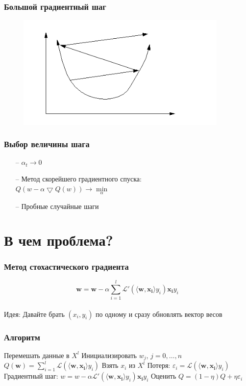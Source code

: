 \documentclass[10pt]{beamer}
\begin{document}
\begin{frame}\frametitle{Большой градиентный шаг}
	\begin{figure}[htbp]
	  \includegraphics[height=160pt, keepaspectratio = true]{images/learning_rate_large}
	\end{figure}
\end{frame}

\begin{frame}\frametitle{Выбор величины шага}
	\begin{itemize}
		\item[--] $\alpha_t \rightarrow 0$\\
		\item[--] Метод скорейшего градиентного спуска:\\
		$Q(w - \alpha \bigtriangledown Q(w)) \rightarrow \min\limits_{\alpha}$
		\item[--] Пробные случайные шаги
	\end{itemize}
\end{frame}

\section{В чем проблема?}

\begin{frame}\frametitle{Метод стохастического градиента}
	$$\mathbf{w} =  \mathbf{w} - \alpha \sum\limits_{i=1}^l \mathcal{L}'(\langle \mathbf{w}, \mathbf{x_i}\rangle y_i)\mathbf{x_i}y_i$$\\
	\bigbreak \pause
	\alert{Идея}: Давайте брать $(x_i, y_i)$ по одному и сразу обновлять вектор весов
\end{frame}

\begin{frame}\frametitle{Алгоритм}
  \begin{algorithmic}[1]
     \State Перемешать данные в $X^l$
     \State Инициализировать $w_j$, $j=0,\dots, n$
     \State ${Q}(\mathbf{w}) = \sum\limits_{i=1}^l \mathcal{L}(\langle \mathbf{w}, \mathbf{x_i} \rangle y_i)$
       \State Взять $x_i$ из $X^l$
       \State Потеря: $\varepsilon_i = \mathcal{L}(\langle \mathbf{w}, \mathbf{x_i} \rangle y_i)$
       \State Градиентный шаг: $w =  w - \alpha \mathcal{L}'(\langle \mathbf{w}, \mathbf{x_i}\rangle y_i)\mathbf{x_i}y_i$
       \State Оценить $Q = (1-\eta)Q + \eta \varepsilon_i$
     \EndRepeat
    \EndFunction
  \end{algorithmic}
\end{frame}
\end{document}
